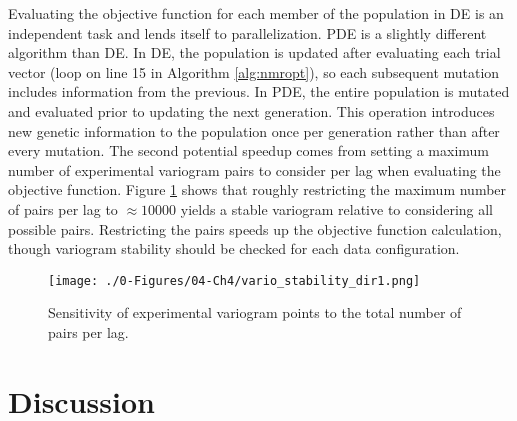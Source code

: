Evaluating the objective function for each member of the population in \gls{DE} is an independent task and lends itself to parallelization. \gls{PDE} is a slightly different algorithm than \gls{DE}. In \gls{DE}, the population is updated after evaluating each trial vector (loop on line 15 in Algorithm \ref{alg:nmropt}), so each subsequent mutation includes information from the previous. In \gls{PDE}, the entire population is mutated and evaluated prior to updating the next generation. This operation introduces new genetic information to the population once per generation rather than after every mutation. The second potential speedup comes from setting a maximum number of experimental variogram pairs to consider per lag when evaluating the objective function. Figure \ref{fig:vario_stability_dir1} shows that roughly restricting the maximum number of pairs per lag to $\approx 10000$ yields a stable variogram relative to considering all possible pairs. Restricting the pairs speeds up the objective function calculation, though variogram stability should be checked for each data configuration.

\begin{figure}[htb!]
    \centering
    \texttt{[image: ./0-Figures/04-Ch4/vario\_stability\_dir1.png]}
    \caption{Sensitivity of experimental variogram points to the total number of pairs per lag.}
    \label{fig:vario_stability_dir1}
\end{figure}

\FloatBarrier
\section{Discussion}
\label{sec:04discuss}

